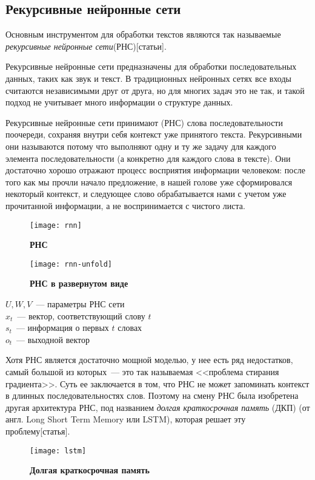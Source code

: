\subsection{Рекурсивные нейронные сети}
Основным инструментом для обработки текстов являются так называемые \emph{рекурсивные нейронные сети}(РНС)[статьи].

Рекурсивные нейронные сети предназначены для обработки последовательных данных, таких как звук и текст. В традиционных нейронных сетях все входы считаются независимыми друг от друга, но для многих задач это не так, и такой подход не учитывает много информации о структуре данных.

Рекурсивные нейронные сети принимают (РНС) слова последовательности поочереди, сохраняя внутри себя контекст уже принятого текста. Рекурсивными они называются потому что выполняют одну и ту же задачу для каждого элемента последовательности (а конкретно для каждого слова в тексте). Они достаточно хорошо отражают процесс восприятия информации человеком: после того как мы прочли начало предложение, в нашей голове уже сформировался некоторый контекст, и следующее слово обрабатывается нами с учетом уже прочитанной информации, а не воспринимается с чистого листа.

\begin{figure}[h]
\texttt{[image: rnn]}
\caption{\textbf{РНС}}
\label{fig:rnn}
\end{figure}

\begin{figure}[h]
\texttt{[image: rnn-unfold]}
\caption{\textbf{РНС в развернутом виде}}
\label{fig:rnn-unfold}
\end{figure}

\noindent $U, W, V$~--- параметры РНС сети\\
$x_t$~--- вектор, соответствующий слову $t$ \\
$s_t$~--- информация о первых $t$ словах \\
$o_t$~--- выходной вектор

Хотя РНС является достаточно мощной моделью, у нее есть ряд недостатков, самый большой из которых~--- это так называемая <<проблема стирания градиента>>. Суть ее заключается в том, что РНС не может запоминать контекст в длинных последовательностях слов. Поэтому на смену РНС была изобретена другая архитектура РНС, под названием \emph{долгая краткосрочная память} (ДКП) (от англ. Long Short Term Memory или LSTM), которая решает эту проблему[статья].

\begin{figure}[h]
\texttt{[image: lstm]}
\caption{\textbf{Долгая краткосрочная память}}
\label{fig:lstm}
\end{figure}

